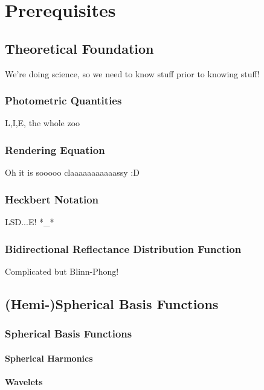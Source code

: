 \documentclass[thesis.tex]{subfiles}
\begin{document}
\chapter{Prerequisites}\label{chap:basics}

\section{Theoretical Foundation}
We're doing science, so we need to know stuff prior to knowing stuff!

\subsection{Photometric Quantities}
L,I,E, the whole zoo

\subsection{Rendering Equation}
Oh it is sooooo claaaaaaaaaaassy :D

\subsection{Heckbert Notation}
LSD...E! *\_*

\subsection{Bidirectional Reflectance Distribution Function}
Complicated but Blinn-Phong!

\section{(Hemi-)Spherical Basis Functions}
\subsection{Spherical Basis Functions}
\subsubsection{Spherical Harmonics}
\subsubsection{Wavelets}
\end{document}
